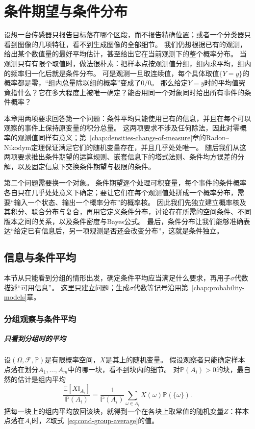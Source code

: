 \chapter{条件期望与条件分布}
\label{chap:conditional-expectation}

设想一台传感器只报告目标落在哪个区段，而不报告精确位置；或者一个分类器只看到图像的几项特征，看不到生成图像的全部细节。
我们仍想根据已有的观测，给出某个数值量的最好平均估计，甚至给出它在当前观测下的整个概率分布。
当观测只有有限个取值时，做法很朴素：把样本点按观测值分组，组内求平均，组内的频率归一化后就是条件分布。
可是观测一旦取连续值，每个具体取值$\{Y=y\}$的概率都是零，“组内总量除以组的概率”变成了$0/0$。
那么给定$Y=y$时的平均值究竟指什么？它在多大程度上被唯一确定？能否用同一个对象同时给出所有事件的条件概率？

本章用两项要求回答第一个问题：条件平均只能使用已有的信息，并且在每个可以观察的事件上保持原变量的积分总量。
这两项要求不涉及任何除法，因此对零概率的观测值同样有意义；第~\ref{chap:densities-change-of-measure}章的Radon--Nikodym定理保证满足它们的随机变量存在，并且几乎处处唯一。
随后我们从这两项要求推出条件期望的运算规则、嵌套信息下的塔式法则、条件均方误差的分解，以及固定信息下交换条件期望与极限的条件。

第二个问题需要换一个对象。
条件期望逐个处理可积变量，每个事件的条件概率各自只在几乎处处意义下确定；要让它们在每个观测值处拼成一个概率分布，需要“输入一个状态、输出一个概率分布”的概率核。
因此我们先独立建立概率核及其积分、联合分布与复合，再用它定义条件分布，讨论存在所需的空间条件、不同版本之间的关系，以及条件密度与Bayes公式。
最后，条件分布让我们能够准确表达“给定已有信息后，另一项观测是否还会改变分布”，这就是条件独立。

\section{信息与条件平均}
\label{sec:cond-information}

本节从只能看到分组的情形出发，确定条件平均应当满足什么要求，再用子$\sigma$代数描述“可用信息”。
这里只建立问题；生成$\sigma$代数等记号沿用第~\ref{chap:probability-models}章。

\subsection{分组观察与条件平均}

\paragraph{只看到分组时的平均}
设$(\Omega,\mathcal F,\mathbb P)$是有限概率空间，$X$是其上的随机变量。
假设观察者只能确定样本点落在划分$A_1,\ldots,A_m$中的哪一块，看不到块内的细节。
对$\mathbb P(A_i)>0$的块，最自然的估计是组内平均
\begin{equation}
  \frac{\mathbb E[X\mathbb I_{A_i}]}{\mathbb P(A_i)}=\frac{1}{\mathbb P(A_i)}\sum_{\omega\in A_i}X(\omega)\mathbb P(\{\omega\}).
  \label{eq:cond-group-average}
\end{equation}
把每一块上的组内平均放回该块，就得到一个在各块上取常值的随机变量$Z$：样本点落在$A_i$时，$Z$取式~\eqref{eq:cond-group-average}的值。


